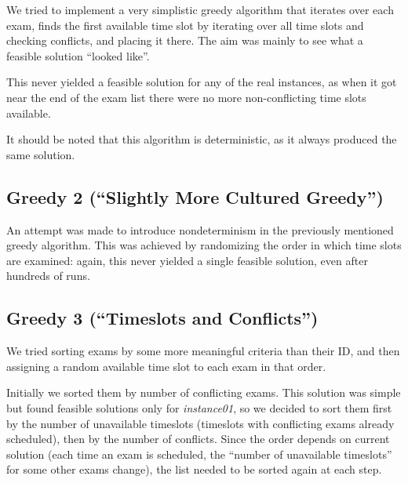 \documentclass[11pt, a4paper, leqno]{article}
\begin{document}
	We tried to implement a very simplistic greedy algorithm that iterates over each exam, finds the first available time slot by iterating over all time slots and checking conflicts, and placing it there. The aim was mainly to see what a feasible solution ``looked like''.
	

	This never yielded a feasible solution for any of the real instances, as when it got near the end of the exam list there were no more non-conflicting time slots available.
	
	It should be noted that this algorithm is deterministic, as it always produced the same solution.
	
	\subsection{Greedy 2 (``Slightly More Cultured Greedy'')}
	
	An attempt was made to introduce nondeterminism in the previously mentioned greedy algorithm. This was achieved by randomizing the order in which time slots are examined: again, this never yielded a single feasible solution, even after hundreds of runs.
	
	\subsection{Greedy 3 (``Timeslots and Conflicts'')}
	
	We tried sorting exams by some more meaningful criteria than their ID, and then assigning a random available time slot to each exam in that order.
	
	Initially we sorted them by number of conflicting exams. This solution was simple but found feasible solutions only for \textit{instance01}, so we decided to sort them first by the number of unavailable timeslots (timeslots with conflicting exams already scheduled), then by the number of conflicts. Since the order depends on current solution (each time an exam is scheduled, the ``number of unavailable timeslots'' for some other exams change), the list needed to be sorted again at each step.
	
\end{document}
